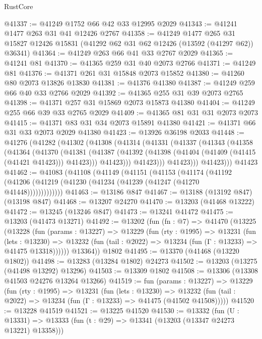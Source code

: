 \begin{lexlean}{RustCore}
\begin{coremodule}
@41337 := @41249 @1752 @66 @42 @33 @12995 @2029
@41343 := @41241 @1477 @263 @31 @41 @12426 @2767
@41358 := @41249
    @1477
    @265
    @31
    @15827
    @12426
    @15831
    (@41292 @62 @31 @62 @12426 (@13592 (@41297 @62)) @36341)
@41364 := @41249 @263 @66 @41 @33 @2767 @2029
@41365 := @41241 @81
@41370 := @41365 @259 @31 @40 @2073 @2766
@41371 := @41249 @81
@41376 := @41371 @261 @31 @15848 @2073 @15852
@41380 := @41260 @80 @2073 @13826 @13830
@41381 := @41376 @41380
@41387 := @41249 @259 @66 @40 @33 @2766 @2029
@41392 := @41365 @255 @31 @39 @2073 @2765
@41398 := @41371 @257 @31 @15869 @2073 @15873 @41380
@41404 := @41249 @255 @66 @39 @33 @2765 @2029
@41409 := @41365 @81 @31 @31 @2073 @2073
@41415 := @41371 @83 @31 @34 @2073 @15891 @41380
@41421 := @41371 @66 @31 @33 @2073 @2029 @41380
@41423 := @13926 @36198 @2033
@41448 := @41276
    (@41282
      (@41302
        (@41308
          (@41314
            (@41331
              (@41337
                (@41343
                  (@41358
                    (@41364
                      (@41370
                        (@41381
                          (@41387
                            (@41392 (@41398 (@41404 (@41409 (@41415 (@41421 @41423))) @41423)))
                            @41423)))
                      @41423)))
                @41423)))
          @41423)))
    @41423
@41462 := @41083
    (@41108
      (@41149
        (@41151
          (@41153
            (@41174
              (@41192 (@41206 (@41219 (@41230 (@41234 (@41239 (@41247 (@41270 @41448)))))))))))))
@41463 := @13186 @847
@41467 := @13188 (@13192 @847) (@13198 @847)
@41468 := @13207 @24270
@41470 := @13203 (@41468 @13222)
@41472 := @13245 (@13246 @847)
@41473 := @13241 @41472
@41475 := @13203 (@41473 @13271)
@41492 := @13202
    (fun (fn : @7) =>
    @41470
      (@13225
        (@13228
          (fun (params : @13227) =>
          @13229
            (fun (rty : @1995) =>
            @13231
              (fun (lets : @13230) =>
              @13232 (fun (tail : @2022) => @13234 (fun (Γ : @13233) => @41475 @13318))))))
        @13364))
    @1802
@41495 := @13370 (@41468 (@13220 @1802))
@41498 := @13283 (@13284 @1802) @24273
@41502 := @13203 (@13275 (@41498 @13292) @13296)
@41503 := @13309 @1802
@41508 := @13306 (@13308 @41503 @24276 @13264 @13266)
@41519 := fun (params : @13227) =>
  @13229
    (fun (rty : @1995) =>
    @13231
      (fun (lets : @13230) =>
      @13232 (fun (tail : @2022) => @13234 (fun (Γ : @13233) => @41475 (@41502 @41508)))))
@41520 := @13228 @41519
@41521 := @13225 @41520
@41530 := @13332
    (fun (U : @13331) => @13333 (fun (t : @29) => @13341 (@13203 (@13347 @24273 @13221) @13358)))

\end{coremodule}
\end{lexlean}
